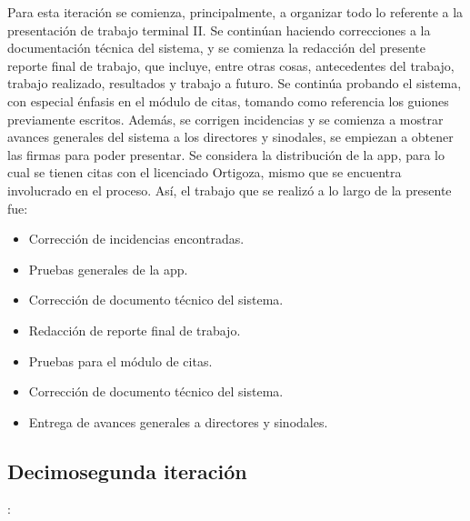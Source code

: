\noindent
Para esta iteración se comienza, principalmente, a organizar todo lo referente a la presentación de trabajo terminal II. Se continúan haciendo correcciones a la documentación técnica del sistema, y se comienza la redacción del presente reporte final de trabajo, que incluye, entre otras cosas, antecedentes del trabajo, trabajo realizado, resultados y trabajo a futuro.
\newline
\newline
Se continúa probando el sistema, con especial énfasis en el módulo de citas, tomando como referencia los guiones previamente escritos. Además, se corrigen incidencias y se comienza a mostrar avances generales del sistema a los directores y sinodales, se empiezan a obtener las firmas para poder presentar. Se considera la distribución de la app, para lo cual se tienen citas con el licenciado Ortigoza, mismo que se encuentra involucrado en el proceso.  
\newline
Así, el trabajo que se realizó a lo largo de la presente fue:
\begin{itemize}
	\item Corrección de incidencias encontradas.
	\item Pruebas generales de la app. 
	\item Corrección de documento técnico del sistema.
	\item Redacción de reporte final de trabajo.
	\item Pruebas para el módulo de citas.
	\item Corrección de documento técnico del sistema.
	\item Entrega de avances generales a directores y sinodales.
\end{itemize}


\subsection{Decimosegunda iteración}: 

